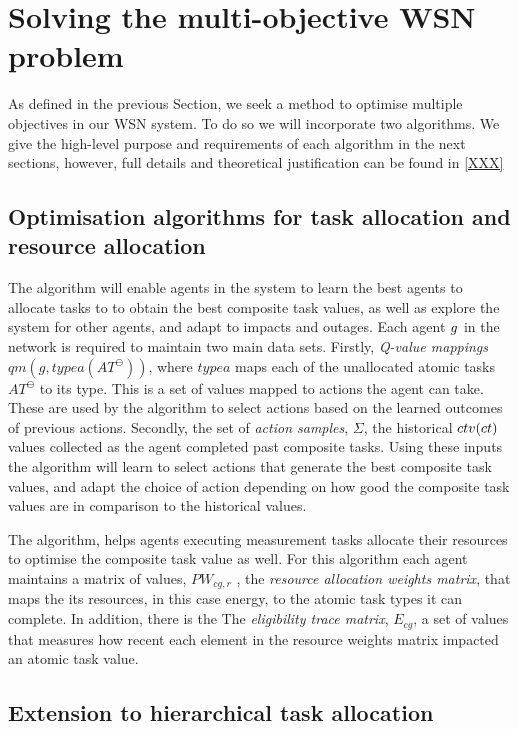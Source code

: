 \section{Solving the multi-objective WSN problem}
\label{section:solution}
As defined in the previous Section, we seek a method to optimise multiple objectives in our WSN system. To do so we will incorporate two algorithms. We give the high-level purpose and requirements of each algorithm in the next sections, however, full details and theoretical justification can be found in \ref{XXX}

\subsection{Optimisation algorithms for task allocation and resource allocation}
The \acronymATARIAExtended{}{} algorithm will enable agents in the system to learn the best agents to allocate tasks to to obtain the best composite task values, as well as explore the system for other agents, and adapt to impacts and outages. Each agent $g_{}^{}$ in the network is required to maintain two main data sets. Firstly, \textit{Q-value mappings} $qm(g, typea(AT^{\ominus}))$, where $typea$ maps each of the unallocated atomic tasks $AT^{\ominus}$ to its type. This is a set of values mapped to actions the agent can take. These are used by the \acronymATARIA{}{} algorithm to select actions based on the learned outcomes of previous actions. Secondly, the set of \textit{action samples}, $\Sigma$, the historical $\functionCompositeTaskValue{}{}$ values collected as the agent completed past composite tasks. Using these inputs the \acronymATARIA{}{} algorithm will learn to select actions that generate the best composite task values, and adapt the choice of action depending on how good the composite task values are in comparison to the historical values.

The \acronymMGRAOExtended{}{} algorithm, helps agents executing measurement tasks allocate their resources to optimise the composite task value as well. For this algorithm each agent maintains a matrix of values, $PW_{cg,r}$ , the \textit{resource allocation weights matrix}, that maps the its resources, in this case energy, to the atomic task types it can complete. In addition, there is the The \textit{eligibility trace matrix}, $E_{cg}$, a set of values that measures how recent each element in the resource weights matrix impacted an atomic task value.


\subsection{Extension to hierarchical task allocation}

